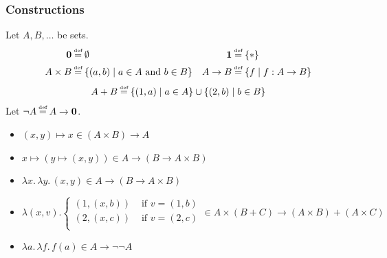 \documentclass{beamer} %
\begin{document}
\begin{frame}
\frametitle{Constructions}

Let $A, B, \dots$ be sets.
\begin{align*}
  \mathbf{0} &\defeq \emptyset &
  \mathbf{1} &\defeq \{ \ast \}  \\
  A \times B &\defeq \{ (a, b) \mid a \in A \text{ and } b \in B \} &
  A \to B &\defeq \{ f \mid f : A \to B \}
\end{align*}
\[
  A + B \defeq \{ (1, a) \mid a \in A \} \cup \{ (2, b) \mid b \in B \}
\]
Let $\lnot A \defeq A \to \mathbf{0}$.

\begin{example}
  \small
  \begin{itemize}
    \item $(x, y) \mapsto x \in (A \times B) \to A$
    \item $x \mapsto (y \mapsto (x, y)) \in A \to (B \to A \times B)$
    \item $\lambda x.\, \lambda y.\, (x, y) \in A \to (B \to A \times B)$
    \item $\lambda (x, v). \begin{cases}
        (1, (x, b)) & \text{ if } v = (1, b) \\
        (2, (x, c)) & \text{ if } v = (2, c) \\
    \end{cases}
    \in A \times (B + C) \to (A \times B) + (A \times C)$
    \item $\lambda a.\, \lambda f.\, f(a) \in A \to \lnot\lnot A$
  \end{itemize}
\end{example}

\end{frame}
\end{document}
